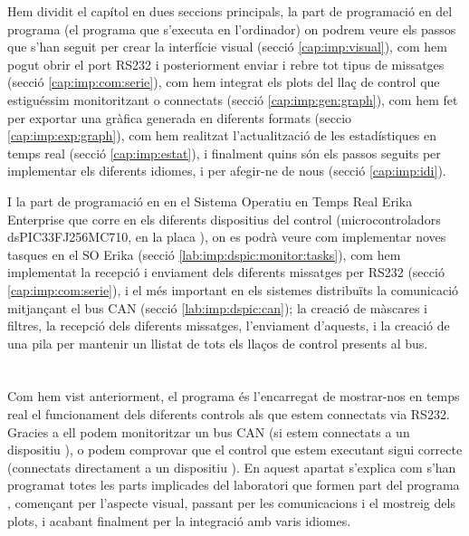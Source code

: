 Hem dividit el capítol en dues seccions principals, la part de programació en \Python del programa \DCSMonitor (el programa que s'executa en l'ordinador) on podrem veure els passos que s'han seguit per crear la interfície visual (secció \ref{cap:imp:visual}), com hem pogut obrir el port RS232 i posteriorment enviar i rebre tot tipus de missatges (secció \ref{cap:imp:com:serie}), com hem integrat els plots del llaç de control que estiguéssim monitoritzant o  connectats (secció \ref{cap:imp:gen:graph}), com hem fet per exportar una gràfica generada en diferents formats (seccio \ref{cap:imp:exp:graph}), com hem realitzat l'actualització de les estadístiques en temps real (secció \ref{cap:imp:estat}), i finalment quins són els passos seguits per implementar els diferents idiomes, i per afegir-ne de nous (secció \ref{cap:imp:idi}). 

I la part de programació en \C en el Sistema Operatiu en Temps Real Erika Enterprise que corre en els diferents dispositius del control (microcontroladors dsPIC33FJ256MC710, en la placa \FLEX), on es podrà veure com implementar noves tasques en el SO Erika (secció \ref{lab:imp:dspic:monitor:tasks}), com hem implementat la recepció i enviament dels diferents missatges per RS232 (secció \ref{cap:imp:com:serie}), i el més important en els sistemes distribuïts la comunicació mitjançant el bus CAN (secció \ref{lab:imp:dspic:can}); la creació de màscares i filtres, la recepció dels diferents missatges, l'enviament d'aquests, i la creació de una pila per mantenir un llistat de tots els llaços de control presents al bus.

\FloatBarrier

\section{\DCSMonitor}\label{cap:imp:dcs}

Com hem vist anteriorment, el programa \DCSMonitor és l'encarregat de mostrar-nos en temps real el funcionament dels diferents controls als que estem connectats via RS232.
Gracies a ell podem monitoritzar un bus CAN (si estem connectats a un dispositiu \Monitor), o podem comprovar que el control que estem executant sigui correcte (connectats directament a un dispositiu \SensorActuador).
En aquest apartat s'explica com s'han programat totes les parts implicades del laboratori que formen part del programa \DCSMonitor, començant per l'aspecte visual, passant per les comunicacions i el mostreig dels plots, i acabant finalment per la integració amb varis idiomes.

